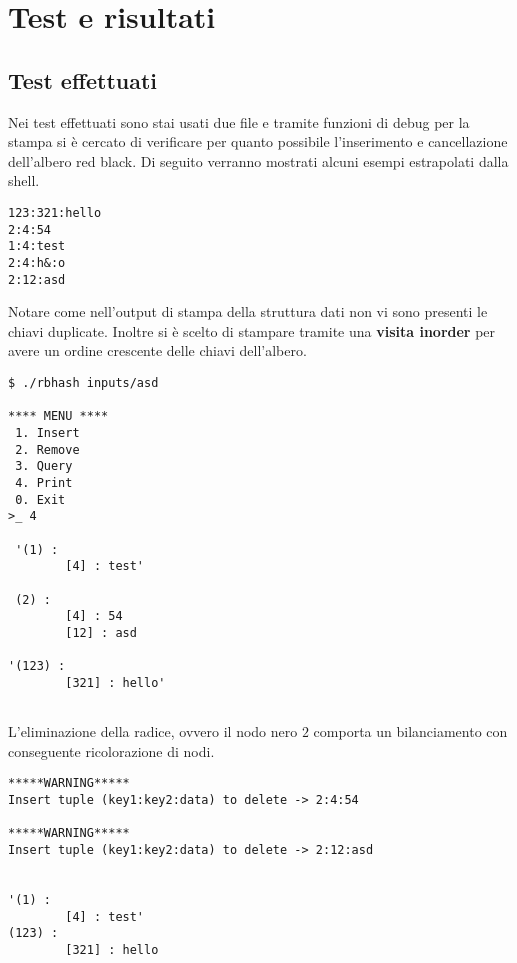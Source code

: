\def\baselinestretch{1}
\section{Test e risultati}
\def\baselinestretch{1.66}
\thispagestyle{headings}

\subsection{Test effettuati}
Nei test effettuati sono stai usati due file e tramite funzioni di debug per 
la stampa si \`e cercato di verificare per quanto possibile l'inserimento
e cancellazione dell'albero red black. Di seguito verranno mostrati 
alcuni esempi estrapolati dalla shell.

\begin{lstlisting}[caption={File di prova con chiavi duplicate},captionpos=b]
123:321:hello
2:4:54
1:4:test
2:4:h&:o
2:12:asd
\end{lstlisting}


Notare come nell'output di stampa della struttura dati non vi sono presenti le chiavi
duplicate. Inoltre si \`e scelto di stampare tramite una \textbf{visita inorder} per avere un ordine crescente delle
chiavi dell'albero.\newline
\begin{verbatim}
$ ./rbhash inputs/asd

**** MENU ****
 1. Insert
 2. Remove
 3. Query
 4. Print
 0. Exit
>_ 4

 '(1) :
        [4] : test'

 (2) :
        [4] : 54
        [12] : asd

'(123) :
        [321] : hello'
        
\end{verbatim}

L'eliminazione della radice, ovvero il nodo nero $2$ comporta un bilanciamento con
conseguente ricolorazione di nodi.


\begin{verbatim}
*****WARNING*****
Insert tuple (key1:key2:data) to delete -> 2:4:54

*****WARNING*****
Insert tuple (key1:key2:data) to delete -> 2:12:asd


'(1) :
        [4] : test'
(123) :
        [321] : hello

\end{verbatim}